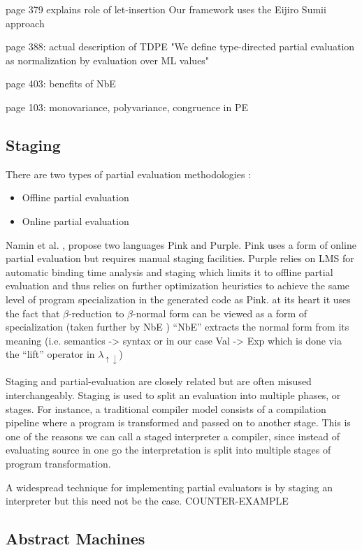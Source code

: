 \documentclass[fleqn]{article}
\theoremstyle{definition}
\newcommand{\mslang}{$\lambda_{\uparrow\downarrow}$}
\begin{document}
page 379 explains role of let-insertion
Our framework uses the Eijiro Sumii  approach

page 388: actual description of TDPE
"We  define  type-directed  partial  evaluation  as normalization  by  evaluation  over  ML values"

page 403: benefits of NbE

\cite{jones1993partial} page 103: monovariance, polyvariance, congruence in PE

\subsection{Staging}
There are two types of partial evaluation methodologies \cite{jones1993partial}:
\begin{itemize}
	\item Offline partial evaluation
	\item Online partial evaluation \cite{cook2011tutorial}
\end{itemize}
Namin et al. \cite{amin2017collapsing}, propose two languages Pink and Purple. Pink uses a form of online partial evaluation but requires manual staging facilities. Purple relies on LMS for automatic binding time analysis and staging
which limits it to offline partial evaluation and thus relies on further optimization heuristics to achieve the same level of program specialization in the generated code as Pink.
at its heart it uses the fact that $\beta$-reduction to $\beta$-normal form can be viewed as a form of specialization (taken further by NbE \cite{berger1991inverse,berger1998normalization})
``NbE'' extracts the normal form from its meaning (i.e. semantics -> syntax or in our case Val -> Exp which is done via the ``lift'' operator in \mslang)

Staging and partial-evaluation are closely related but are often misused interchangeably. Staging is used to split an evaluation into multiple phases, or stages. For instance, a traditional compiler model consists of a compilation pipeline where a program is transformed and passed on to another stage. This is one of the reasons we can call a staged interpreter a compiler, since instead of evaluating source in one go the interpretation is split into multiple stages of program transformation.

A widespread technique for implementing partial evaluators is by staging an interpreter but this need not be the case. COUNTER-EXAMPLE

\subsection{Abstract Machines}
\end{document}
